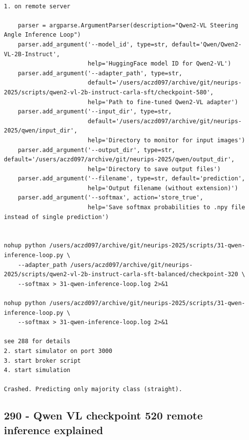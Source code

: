 \begin{verbatim}

1. on remote server 

    parser = argparse.ArgumentParser(description="Qwen2-VL Steering Angle Inference Loop")
    parser.add_argument('--model_id', type=str, default='Qwen/Qwen2-VL-2B-Instruct',
                        help='HuggingFace model ID for Qwen2-VL')
    parser.add_argument('--adapter_path', type=str,
                        default='/users/aczd097/archive/git/neurips-2025/scripts/qwen2-vl-2b-instruct-carla-sft/checkpoint-580',
                        help='Path to fine-tuned Qwen2-VL adapter')
    parser.add_argument('--input_dir', type=str,
                        default='/users/aczd097/archive/git/neurips-2025/qwen/input_dir',
                        help='Directory to monitor for input images')
    parser.add_argument('--output_dir', type=str, default='/users/aczd097/archive/git/neurips-2025/qwen/output_dir',
                        help='Directory to save output files')
    parser.add_argument('--filename', type=str, default='prediction',
                        help='Output filename (without extension)')
    parser.add_argument('--softmax', action='store_true',
                        help='Save softmax probabilities to .npy file instead of single prediction')


nohup python /users/aczd097/archive/git/neurips-2025/scripts/31-qwen-inference-loop.py \
    --adapter_path /users/aczd097/archive/git/neurips-2025/scripts/qwen2-vl-2b-instruct-carla-sft-balanced/checkpoint-320 \
    --softmax > 31-qwen-inference-loop.log 2>&1

nohup python /users/aczd097/archive/git/neurips-2025/scripts/31-qwen-inference-loop.py \
    --softmax > 31-qwen-inference-loop.log 2>&1    

see 288 for details
2. start simulator on port 3000
3. start broker script
4. start simulation

Crashed. Predicting only majority class (straight).
\end{verbatim}

\subsection{290 - Qwen VL checkpoint 520 remote inference explained}
\label{app_res:290}

